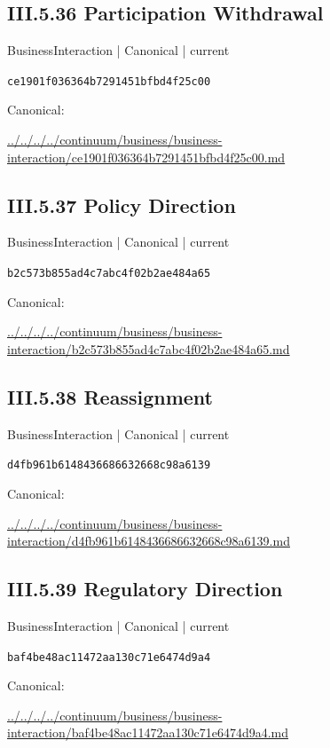 \documentclass[10pt,a4paper]{article}
\begin{document}
\subsection*{III.5.36 Participation Withdrawal}
\label{element-ce1901f036364b7291451bfbd4f25c00}
{\small BusinessInteraction | Canonical | current}\par
\texttt{ce1901f036364b7291451bfbd4f25c00}\par
Canonical: \par
{\footnotesize\url{../../../../continuum/business/business-interaction/ce1901f036364b7291451bfbd4f25c00.md}}\par
\subsection*{III.5.37 Policy Direction}
\label{element-b2c573b855ad4c7abc4f02b2ae484a65}
{\small BusinessInteraction | Canonical | current}\par
\texttt{b2c573b855ad4c7abc4f02b2ae484a65}\par
Canonical: \par
{\footnotesize\url{../../../../continuum/business/business-interaction/b2c573b855ad4c7abc4f02b2ae484a65.md}}\par
\subsection*{III.5.38 Reassignment}
\label{element-d4fb961b6148436686632668c98a6139}
{\small BusinessInteraction | Canonical | current}\par
\texttt{d4fb961b6148436686632668c98a6139}\par
Canonical: \par
{\footnotesize\url{../../../../continuum/business/business-interaction/d4fb961b6148436686632668c98a6139.md}}\par
\subsection*{III.5.39 Regulatory Direction}
\label{element-baf4be48ac11472aa130c71e6474d9a4}
{\small BusinessInteraction | Canonical | current}\par
\texttt{baf4be48ac11472aa130c71e6474d9a4}\par
Canonical: \par
{\footnotesize\url{../../../../continuum/business/business-interaction/baf4be48ac11472aa130c71e6474d9a4.md}}\par
\end{document}
